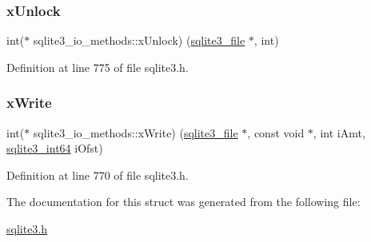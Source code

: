 \subsubsection{\texorpdfstring{x\+Unlock}{xUnlock}}
{\footnotesize\ttfamily int($\ast$ sqlite3\+\_\+io\+\_\+methods\+::x\+Unlock) (\mbox{\hyperlink{structsqlite3__file}{sqlite3\+\_\+file}} $\ast$, int)}



Definition at line 775 of file sqlite3.\+h.

\mbox{\label{structsqlite3__io__methods_a659f6a40777b685c6a6b80e5f07a3328}} 
\subsubsection{\texorpdfstring{x\+Write}{xWrite}}
{\footnotesize\ttfamily int($\ast$ sqlite3\+\_\+io\+\_\+methods\+::x\+Write) (\mbox{\hyperlink{structsqlite3__file}{sqlite3\+\_\+file}} $\ast$, const void $\ast$, int i\+Amt, \mbox{\hyperlink{sqlite3_8h_a0a4d3e6c1ad46f90e746b920ab6ca0d2}{sqlite3\+\_\+int64}} i\+Ofst)}



Definition at line 770 of file sqlite3.\+h.



The documentation for this struct was generated from the following file\+:\begin{DoxyCompactItemize}
\item 
\mbox{\hyperlink{sqlite3_8h}{sqlite3.\+h}}\end{DoxyCompactItemize}
